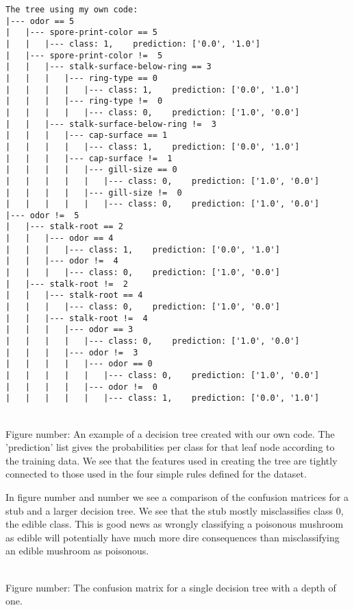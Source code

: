 \documentclass[11pt]{article}
\begin{document}
\begin{BVerbatim}
The tree using my own code:
|--- odor == 5
|   |--- spore-print-color == 5
|   |   |--- class: 1,    prediction: ['0.0', '1.0']
|   |--- spore-print-color !=  5
|   |   |--- stalk-surface-below-ring == 3
|   |   |   |--- ring-type == 0
|   |   |   |   |--- class: 1,    prediction: ['0.0', '1.0']
|   |   |   |--- ring-type !=  0
|   |   |   |   |--- class: 0,    prediction: ['1.0', '0.0']
|   |   |--- stalk-surface-below-ring !=  3
|   |   |   |--- cap-surface == 1
|   |   |   |   |--- class: 1,    prediction: ['0.0', '1.0']
|   |   |   |--- cap-surface !=  1
|   |   |   |   |--- gill-size == 0
|   |   |   |   |   |--- class: 0,    prediction: ['1.0', '0.0']
|   |   |   |   |--- gill-size !=  0
|   |   |   |   |   |--- class: 0,    prediction: ['1.0', '0.0']
|--- odor !=  5
|   |--- stalk-root == 2
|   |   |--- odor == 4
|   |   |   |--- class: 1,    prediction: ['0.0', '1.0']
|   |   |--- odor !=  4
|   |   |   |--- class: 0,    prediction: ['1.0', '0.0']
|   |--- stalk-root !=  2
|   |   |--- stalk-root == 4
|   |   |   |--- class: 0,    prediction: ['1.0', '0.0']
|   |   |--- stalk-root !=  4
|   |   |   |--- odor == 3
|   |   |   |   |--- class: 0,    prediction: ['1.0', '0.0']
|   |   |   |--- odor !=  3
|   |   |   |   |--- odor == 0
|   |   |   |   |   |--- class: 0,    prediction: ['1.0', '0.0']
|   |   |   |   |--- odor !=  0
|   |   |   |   |   |--- class: 1,    prediction: ['0.0', '1.0']	
\end{BVerbatim}
\\
Figure number: An example of a decision tree created with our own code. The 'prediction' list gives the probabilities per class for that leaf node according to the training data. We see that the features used in creating the tree are tightly connected to those used in the four simple rules defined for the dataset.
{ \hspace*{\fill} \\}

In figure number and number we see a comparison of the confusion matrices for a stub and a larger decision tree. We see that the stub mostly misclassifies class 0, the edible class. This is good news as wrongly classifying a poisonous mushroom as edible will potentially have much more dire consequences than misclassifying an edible mushroom as poisonous.

\begin{center}
\end{center}
{ \hspace*{\fill} \\}
Figure number: The confusion matrix for a single decision tree with a depth of one.
\end{document}
